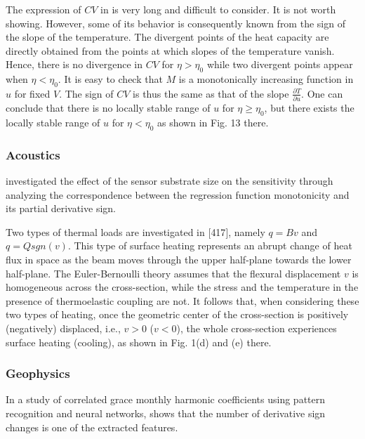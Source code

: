 \documentclass[11pt]{book}
\begin{document}
The expression of $CV$ in \cite{nakarachinda2021effective} is very
long and difficult to consider. It is not worth showing. However,
some of its behavior is consequently known from the sign of the slope
of the temperature. The divergent points of the heat capacity are
directly obtained from the points at which slopes of the temperature
vanish. Hence, there is no divergence in $CV$ for $\eta>\eta_{0}$
while two divergent points appear when $\eta<\eta_{0}$. It is easy
to check that $M$ is a monotonically increasing function in $u$
for fixed $V$. The sign of $CV$ is thus the same as that of the
slope $\frac{\partial T}{\partial u}$. One can conclude that there
is no locally stable range of $u$ for $\eta\geq\eta_{0}$, but there
exists the locally stable range of $u$ for $\eta<\eta_{0}$ as shown
in Fig. 13 there.


\subsubsection{Acoustics}

\cite{lei2014novel} investigated the effect of the sensor substrate
size on the sensitivity through analyzing the correspondence between
the regression function monotonicity and its partial derivative sign.

Two types of thermal loads are investigated in {[}417{]}, namely $q=Bv$
and $q=Qsgn\left(v\right)$. This type of surface heating represents
an abrupt change of heat flux in space as the beam moves through the
upper half-plane towards the lower half-plane. The Euler-Bernoulli
theory assumes that the flexural displacement $v$ is homogeneous
across the cross-section, while the stress and the temperature in
the presence of thermoelastic coupling are not. It follows that, when
considering these two types of heating, once the geometric center
of the cross-section is positively (negatively) displaced, i.e., $v>0$
($v<0$), the whole cross-section experiences surface heating (cooling),
as shown in Fig. 1(d) and (e) there.


\subsubsection{Geophysics}

In a study of correlated
grace monthly harmonic coefficients using pattern recognition and neural networks, \cite{piretzidis2016identification} shows that the number of derivative sign changes is one of the extracted features. 
\end{document}
